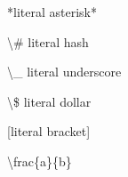 \documentclass{article}
\begin{document}
*literal asterisk*

\textbackslash{}\# literal hash

\textbackslash{}\_ literal underscore

\textbackslash{}\$ literal dollar

[literal bracket]

\textbackslash{}frac\{a\}\{b\}
\end{document}
